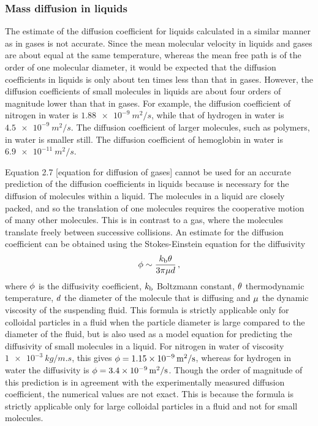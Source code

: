 \subsubsection{Mass diffusion in liquids}
The estimate of the diffusion coefficient for liquids calculated in a similar manner as in gases is not accurate. Since the mean molecular velocity in liquids and gases are about equal at the same temperature, whereas the mean free path is of the order of one molecular diameter, it would be expected that the diffusion coefficients in liquids is only about ten times less than that in gases. However, the diffusion coefficients of small molecules in liquids are about four orders of magnitude lower than that in gases. For example, the diffusion coefficient of nitrogen in water is $\SI{1.88e-9}{m^2/s}$, while that of hydrogen in water is $\SI{4.5e-9}{m^2/s}$. The diffusion coefficient of larger molecules, such as polymers, in water is smaller still. The diffusion coefficient of hemoglobin in water is $\SI{6.9e-11}{m^2/s}$.

Equation 2.7 [equation for diffusion of gases] cannot be used for an accurate prediction of the diffusion coefficients in liquids because  is necessary for the diffusion of molecules within a liquid. The molecules in a liquid are closely packed, and so the translation of one molecules requires the cooperative motion of many other molecules. This is in contrast to a gas, where the molecules translate freely between successive collisions. An estimate for the diffusion coefficient can be obtained using the Stokes-Einstein equation for the diffusivity
\begin{equation}\label{eq:stokeseinsteinequationformassdiffusion}
\phi\sim\dfrac{k_\text{b}\theta}{3\pi\mu d}\,,
\end{equation}
where $\phi$ is the diffusivity coefficient, $k_\text{b}$ Boltzmann constant, $\theta$ thermodynamic temperature, $d$ the diameter of the molecule that is diffusing and $\mu$ the dynamic viscosity of the suspending fluid. This formula is strictly applicable only for colloidal particles in a fluid when the particle diameter is large compared to the diameter of the fluid, but is also used as a model equation for predicting the diffusivity of small molecules in a liquid. For nitrogen in water of viscosity $\SI{1e-3}{kg/m.s}$, this gives $\phi = \SI{1.15e-9}{m^2/s}$, whereas for hydrogen in water the diffusivity is $\phi = \SI{3.4e-9}{m^2/s}$. Though the order of magnitude of this prediction is in agreement with the experimentally measured diffusion coefficient, the numerical values are not exact. This is because the formula is strictly applicable only for large colloidal particles in a fluid and not for small molecules.

